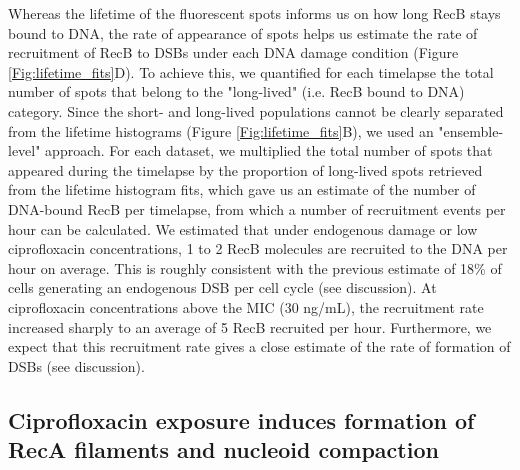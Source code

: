 Whereas the lifetime of the fluorescent spots informs us on how long RecB stays bound to DNA, the rate of appearance of spots helps us estimate the rate of recruitment of RecB to DSBs under each DNA damage condition (Figure \ref{Fig:lifetime_fits}D). To achieve this, we quantified for each timelapse the total number of spots that belong to the "long-lived" (i.e. RecB bound to DNA) category. Since the short- and long-lived populations cannot be clearly separated from the lifetime histograms (Figure \ref{Fig:lifetime_fits}B), we used an "ensemble-level" approach. For each dataset, we multiplied the total number of spots that appeared during the timelapse by the proportion of long-lived spots retrieved from the lifetime histogram fits, which gave us an estimate of the number of DNA-bound RecB per timelapse, from which a number of recruitment events per hour can be calculated. We estimated that under endogenous damage or low ciprofloxacin concentrations, 1 to 2 RecB molecules are recruited to the DNA per hour on average. This is roughly consistent with the previous estimate of 18\% of cells generating an endogenous DSB per cell cycle\cite{Sinha2018} (see discussion). At ciprofloxacin concentrations above the MIC (30 ng/mL), the recruitment rate increased sharply to an average of 5 RecB recruited per hour. Furthermore, we expect that this recruitment rate gives a close estimate of the rate of formation of DSBs (see discussion).

\subsection*{Ciprofloxacin exposure induces formation of RecA filaments and nucleoid compaction}

